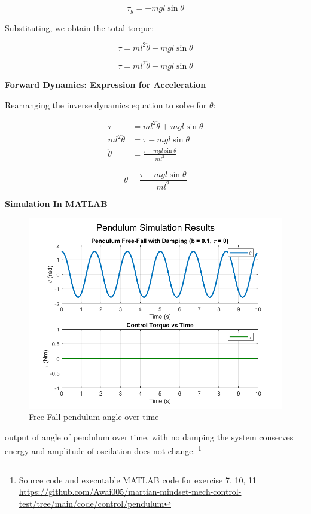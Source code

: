 \documentclass[12pt,a4paper]{article}
\begin{document}
\[
\tau_g = -mgl\sin\theta
\]

Substituting, we obtain the total torque:

\[
\tau = ml^2\ddot{\theta} + mgl\sin\theta
\]


\[
\tau = ml^2\ddot{\theta} + mgl\sin\theta
\]

\vspace{1em}

\textbf{Forward Dynamics: Expression for Acceleration}

Rearranging the inverse dynamics equation to solve for \( \ddot{\theta} \):

\begin{align*}
\tau &= ml^2\ddot{\theta} + mgl\sin\theta \\
ml^2\ddot{\theta} &= \tau - mgl\sin\theta \\
\ddot{\theta} &= \frac{\tau - mgl\sin\theta}{ml^2}
\end{align*}


\[
\ddot{\theta} = \frac{\tau - mgl\sin\theta}{ml^2}
\]

\textbf{Simulation In MATLAB}
\begin{figure}[htbp]
  \centering
  \includegraphics[width=0.9\linewidth]{../figs/exercise_7.png}
  \caption{Free Fall pendulum angle over time}
  \label{fig:slider crank}
\end{figure}
output of angle of pendulum over time. with no damping the system conserves energy and amplitude of oscilation does not change.
\footnote{Source code and executable MATLAB code for exercise 7, 10, 11
\url{https://github.com/Awai005/martian-mindset-mech-control-test/tree/main/code/control/pendulum}}
\end{document}
